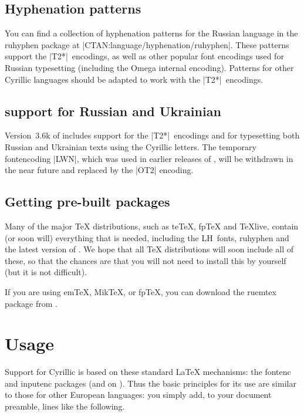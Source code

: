 \documentclass{ltxguide}[1999/02/28]
\begin{document}
\subsection{Hyphenation patterns}

You can find a collection of hyphenation patterns for the Russian
language in the \textsf{ruhyphen} package at
|CTAN:language/hyphenation/ruhyphen|.  These patterns support the
|T2*|~encodings, as well as other popular font encodings used for
Russian typesetting (including the Omega internal encoding).
Patterns for other Cyrillic languages should be adapted to work with
the |T2*|~encodings.

\subsection{\babel{} support for Russian and Ukrainian}
\label{bblrus}

Version~3.6k of \babel{} includes support for the |T2*|~encodings and
for typesetting both Russian and Ukrainian texts using the Cyrillic
letters.  The temporary fontencoding |LWN|, which was used in earlier
releases of \babel{}, will be withdrawn in the near future and replaced
by the |OT2| encoding.

\subsection{Getting pre-built packages}

Many of the major \TeX{} distributions, such as te\TeX{}, fp\TeX{} and
\TeX{}live, contain (or soon will) everything that is needed,
including the LH~fonts, \textsf{ruhyphen} and the latest version of
\babel{}.  We hope that all \TeX{} distributions will soon include all
of these, so that the chances are that you will not need to install
this by yourself (but it is not difficult).

If you are using em\TeX, Mik\TeX, or fp\TeX, you
can download the \textsf{ruemtex} package from
.

\section{Usage}

Support for Cyrillic is based on these standard \LaTeX{} mechanisms:
the \textsf{fontenc} and \textsf{inputenc} packages (and on \babel{}).
Thus the basic principles for its use are similar to those for other
European languages: you simply add, to your document preamble, lines
like the following.
\end{document}
